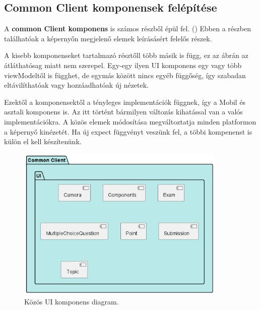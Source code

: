 \subsection{Common Client komponensek felépítése}

A \textbf{common Client komponens} is számos részből épül fel. ()
Ebben a részben találhatóak a képernyőn megjelenő elemek leírásásért felelős részek.

A kisebb komponenseket tartalmazó résztőll több másik is függ, ez az ábrán az átláthatósag miatt nem szerepel.
Egy-egy ilyen UI komponens egy vagy több viewModeltől is függhet, de egymás között nincs egyéb függőség, így szabadan eltávilíthatóak vagy hozzáadhatóak új nézetek.

Ezektől a komponensektől a tényleges implementációk függnek, így a Mobil és asztali komponens is.
Az itt történt bármilyen változás kihatással van a valós implementációkra.
A közös elemek módosítása megváltoztatja minden platformon a képernyő kinézetét.
Ha új expect függvényt veszünk fel, a többi kompenenst is külön el kell készítenünk.


\begin{figure}[!ht]
    \centering
    \includegraphics[width=100mm, keepaspectratio]{figures/Common Component.png}
    \caption{Közös UI komponens diagram.}
    \label{fig:CommonComponentDiagram}
\end{figure}